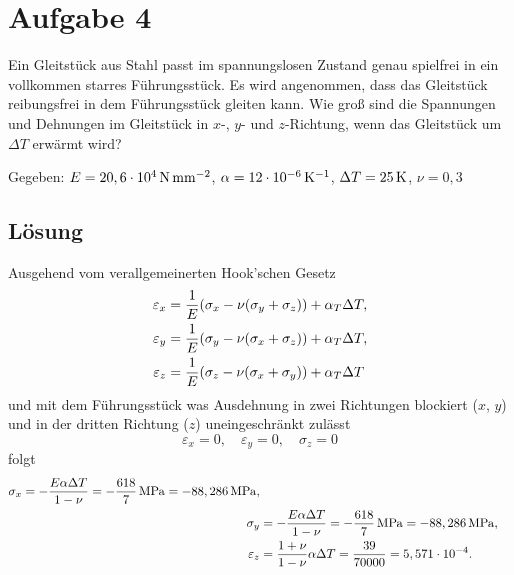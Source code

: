 \documentclass{exercise}
\begin{document}
    \section*{Aufgabe 4}
    
    \begin{problem}
        Ein Gleitstück aus Stahl passt im spannungslosen Zustand genau spielfrei in ein vollkommen starres Führungsstück.
        Es wird angenommen, dass das Gleitstück reibungsfrei in dem Führungsstück gleiten kann.
        Wie groß sind die Spannungen und Dehnungen im Gleitstück in \(x\)-, \(y\)- und \(z\)-Richtung, wenn das Gleitstück um \(\Delta T\) erwärmt wird?
        
        Gegeben: \(E = 20,6 \cdot 10^4\,\si{\newton\per\milli\meter\squared}\), \(\alpha = 12 \cdot 10^{-6}\,\si{\per\kelvin}\), \(\Delta T = 25\,\si{\kelvin}\), \(\nu = 0,3\)
    \end{problem}
    
    \subsection*{Lösung}
    Ausgehend vom verallgemeinerten Hook'schen Gesetz
    \begin{align*}
        \varepsilon_x &= \frac{1}{E}\parentheses*{\sigma_x - \nu\parentheses*{\sigma_y + \sigma_z}} + \alpha_T \Delta T,\\
        \varepsilon_y &= \frac{1}{E}\parentheses*{\sigma_y - \nu\parentheses*{\sigma_x + \sigma_z}} + \alpha_T \Delta T,\\
        \varepsilon_z &= \frac{1}{E}\parentheses*{\sigma_z - \nu\parentheses*{\sigma_x + \sigma_y}} + \alpha_T \Delta T
    \end{align*}
    und mit dem Führungsstück was Ausdehnung in zwei Richtungen blockiert (\(x\), \(y\)) und in der dritten Richtung (\(z\)) uneingeschränkt zulässt
    \[
        \varepsilon_x = 0, \quad \varepsilon_y = 0, \quad \sigma_z = 0
    \]
    folgt
    \begin{align*}
        \sigma_x = -\frac{E\alpha\Delta T}{1 - \nu} = -\frac{618}{7}\,\si{\mega\pascal} = -88,286\,\si{\mega\pascal},\\
        \sigma_y &= -\frac{E\alpha\Delta T}{1 - \nu} = -\frac{618}{7}\,\si{\mega\pascal} = -88,286\,\si{\mega\pascal},\\
        \varepsilon_z &= \frac{1 + \nu}{1 - \nu}\alpha\Delta T = \frac{39}{70000} = 5,571 \cdot 10^{-4}.
    \end{align*}
    
\end{document}
